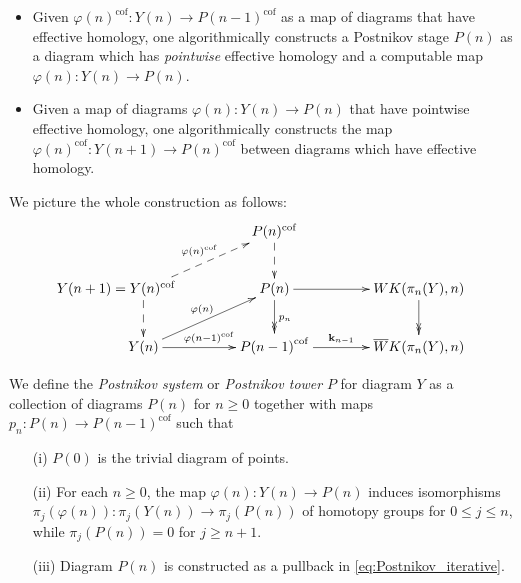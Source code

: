 \documentclass[12pt,a4wide]{article}
\theoremstyle{plain}
\theoremstyle{definition}
\newcommand{\cofr}{\mathrm{cof}}
\newcommand{\Pst}[1]{P(#1)}
\newcommand{\Pnewst}{\Pst{\then}}
\newcommand{\Poldst}{\Pst{\then-1}}
\newcommand{\Pzerost}{\Pst{0}}
\newcommand{\Yst}[1]{Y(#1)}
\newcommand{\Ynewst}{\Yst{\then}}
\newcommand{\Ynnewst}{\Yst{\then+1}}
\newcommand{\towercompmap}[2]{#1(#2)}
\newcommand{\varphist}[1]{\towercompmap{\varphi}{#1}}
\newcommand{\varphin}{\towercompmap{\varphi}{\then}}
\newcommand{\varphinmo}{\towercompmap{\varphi}{\then-1}}
\newcommand{\KnstY}{\overline WK(\pi_\then(Y),\then)}
\newcommand{\EnstY}{WK(\pi_\then(Y),\then)}
\newcommand{\then}{n}
\newcommand{\thedim}{{n}}
\renewcommand\:{\colon}
\newcommand{\dpi}{\pi}
\newcommand\kkk{{\mathbf{k}}}
\begin{document}
\begin{itemize}
\item Given $\varphist{\thedim}^\cofr \colon \Ynewst \to {\Poldst}^\cofr$ as a map of diagrams that have effective homology, one algorithmically constructs a Postnikov stage $\Pnewst$ as a diagram  which has \emph{pointwise} effective homology and a computable map $\varphist{n} \colon \Ynewst \to \Pnewst$. 

\item Given a map of diagrams $\varphist{\thedim} \colon \Ynewst  \to \Pnewst$ that have pointwise effective homology, one algorithmically constructs the map $\varphin^\cofr \colon \Yst{\thedim+1} \to \Pnewst^\cofr$ between diagrams which have effective homology.

\end{itemize}
We picture the whole construction as follows:
\begin{equation}\label{eq:Postnikov_iterative}
\xymatrix@C=40pt{
{} & {\Pnewst^\cofr }\ar@{-->}[d]&{} \\
 \rightbox{\Ynnewst}{{}={\Ynewst^\cofr}} \ar@{-->}[ur]^{\varphin^\cofr}   \ar@{-->}[d] & \Pnewst \ar@{->>}[d]^{p_n} \ar[r] & \EnstY \ar@{->>}[d] \\
\Ynewst \ar[r]^{\varphinmo^\cofr}  \ar[ur]^{\varphin}& {\Poldst}^\cofr\ar[r]^-{\kkk_{\thedim-1}} & \KnstY
} 
\end{equation}

We define the \emph{Postnikov system} or \emph{Postnikov tower} $P$ for diagram $Y$ as a collection of diagrams $\Pnewst $ for $\thedim \geq 0$ together with maps $p_n\: \Pnewst \to {\Poldst}^\cofr$ such that
\begin{enumerate}
\item[(i)] $\Pzerost$ is the trivial diagram of points.
\item[(ii)] For each $\thedim\ge 0$,
the map $\varphin: \Ynewst \to \Pnewst$
induces isomorphisms  $\dpi_j (\varphin):\dpi_j(\Ynewst)\to \dpi_j(\Pnewst)$
of homotopy groups for $0\le j\le\thedim$,
while $\dpi_j(\Pnewst)=0$ for $j\ge \thedim+1$.
\item[(iii)] Diagram $\Pnewst$ is constructed as a pullback in \eqref{eq:Postnikov_iterative}.
\end{enumerate}
\end{document}
